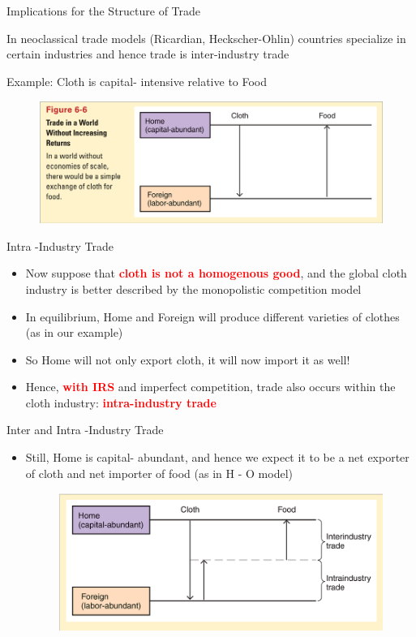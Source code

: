 \documentclass[10pt,hyperref={CJKbookmarks=true},xcolor=dvipsnames,aspectratio=169]{beamer}
\begin{document}
\begin{frame}{Implications for the Structure of Trade }


In neoclassical trade models (Ricardian, Heckscher-Ohlin) countries
specialize in certain industries and hence trade is inter-industry
trade 

Example: Cloth is capital- intensive relative to Food 
\begin{figure}
\centering{}\includegraphics[width=12cm]{fig/krugman/lec6-18}
\end{figure}



\end{frame}

\begin{frame}{Intra -Industry Trade }

\begin{itemize}
\item Now suppose that \textbf{\textcolor{red}{cloth is not a homogenous
good}}, and the global cloth industry is better described by the monopolistic
competition model 
\item In equilibrium, Home and Foreign will produce different varieties
of clothes (as in our example)
\item So Home will not only export cloth, it will now import it as well!
\item Hence, \textbf{\textcolor{red}{with IRS}} and imperfect competition,
trade also occurs within the cloth industry: \textbf{\textcolor{red}{intra-industry
trade}}
\end{itemize}
\end{frame}

\begin{frame}{Inter and Intra -Industry Trade}

\begin{itemize}
\item Still, Home is capital- abundant, and hence we expect it to be a net
exporter of cloth and net importer of food (as in H - O model) 
\begin{figure}
\centering{}\includegraphics[width=11cm]{fig/krugman/lec6-19}
\end{figure}

\end{itemize}
\end{frame}
\end{document}
